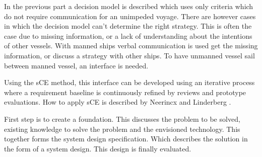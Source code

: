 In the previous part a decision model is described which uses only criteria which do not require communication for an unimpeded voyage. There are however cases in which the decision model can't determine the right strategy. This is often the case due to missing information, or a lack of understanding about the intentions of other vessels. With manned ships verbal communication is used get the missing information, or discuss a strategy with other ships. To have unmanned vessel sail between manned vessel, an interface is needed.

Using the \acf{sCE} method, this interface can be developed using an iterative process where a  requirement  baseline  is  continuously  refined by  reviews  and  prototype  evaluations. How to apply \ac{sCE} is described by Neerincx and Linderberg \cite{Neerincx2012}.

First step is to create a foundation. This discusses the problem to be solved, existing knowledge to solve the problem and the envisioned technology. This together forms the system design specification. Which describes the solution in the form of a system design. This design is finally evaluated.